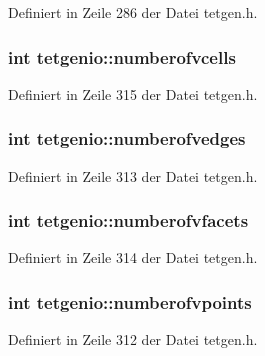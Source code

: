 Definiert in Zeile 286 der Datei tetgen.\-h.

\hypertarget{classtetgenio_afbc917d5c352817d0668170f71bb8404}{
\subsubsection[{numberofvcells}]{\setlength{\rightskip}{0pt plus 5cm}int tetgenio\-::numberofvcells}}\label{classtetgenio_afbc917d5c352817d0668170f71bb8404}


Definiert in Zeile 315 der Datei tetgen.\-h.

\hypertarget{classtetgenio_a4c8ba7851351b7f70e3ef837e2900f74}{
\subsubsection[{numberofvedges}]{\setlength{\rightskip}{0pt plus 5cm}int tetgenio\-::numberofvedges}}\label{classtetgenio_a4c8ba7851351b7f70e3ef837e2900f74}


Definiert in Zeile 313 der Datei tetgen.\-h.

\hypertarget{classtetgenio_a054e5d022a3e6c6cb490975487390bba}{
\subsubsection[{numberofvfacets}]{\setlength{\rightskip}{0pt plus 5cm}int tetgenio\-::numberofvfacets}}\label{classtetgenio_a054e5d022a3e6c6cb490975487390bba}


Definiert in Zeile 314 der Datei tetgen.\-h.

\hypertarget{classtetgenio_a418782ab7caedfd9c316905996400553}{
\subsubsection[{numberofvpoints}]{\setlength{\rightskip}{0pt plus 5cm}int tetgenio\-::numberofvpoints}}\label{classtetgenio_a418782ab7caedfd9c316905996400553}


Definiert in Zeile 312 der Datei tetgen.\-h.

